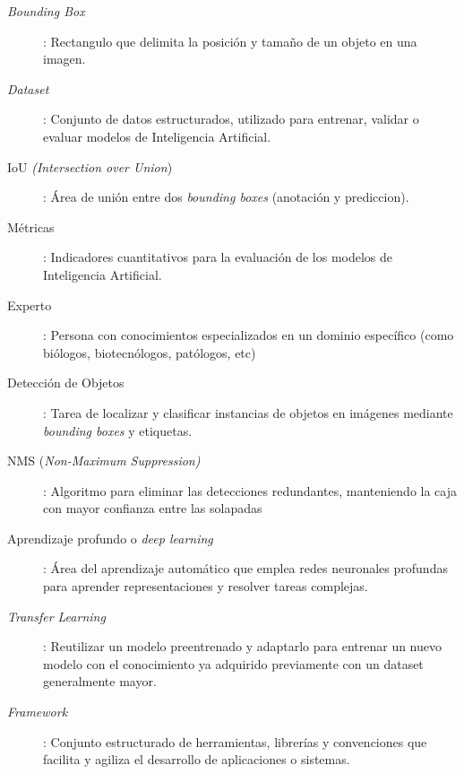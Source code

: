 \documentclass[12pt,a4paper,onecolumn,oneside]{report}
\begin{document}
\begin{description}
  \item[\textit{Bounding Box}]: Rectangulo que delimita la posición y tamaño de un objeto en una imagen.
  \item[\textit{Dataset}]: Conjunto de datos estructurados, utilizado para entrenar, validar o evaluar modelos de Inteligencia Artificial.
  \item[IoU \textit{(Intersection over Union})]: Área de unión entre dos \textit{bounding boxes} (anotación y prediccion).
  \item[Métricas]: Indicadores cuantitativos para la evaluación de los modelos de Inteligencia Artificial.
  \item[Experto]: Persona con conocimientos especializados en un dominio específico (como biólogos, biotecnólogos, patólogos, etc)
  \item[Detección de Objetos]: Tarea de localizar y clasificar instancias de objetos en imágenes mediante \textit{bounding boxes} y etiquetas.
  \item[NMS (\textit{Non-Maximum Suppression)}]: Algoritmo para eliminar las detecciones redundantes, manteniendo la caja con mayor confianza entre las solapadas
  \item[Aprendizaje profundo o \textit{deep learning}]: Área del aprendizaje automático que emplea redes neuronales profundas para aprender representaciones y resolver tareas complejas.
  \item[\textit{Transfer Learning}]: Reutilizar un modelo preentrenado y adaptarlo para entrenar un nuevo modelo con el conocimiento ya adquirido previamente con un dataset generalmente mayor.
  \item[\textit{Framework}]: Conjunto estructurado de herramientas, librerías y convenciones que facilita y agiliza el desarrollo de aplicaciones o sistemas.

\end{description}
\end{document}
